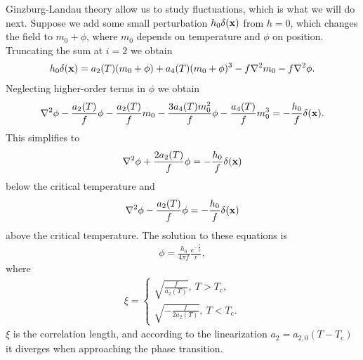 Ginzburg-Landau theory allow us to study fluctuations, which is what we will do next. Suppose we add some small perturbation $h_{0}\delta(\vb{x})$ from $h = 0$, which changes the field to $m_{0} + \phi$, where $m_{0}$ depends on temperature and $\phi$ on position. Truncating the sum at $i = 2$ we obtain
\begin{align*}
	h_{0}\delta(\vb{x}) = a_{2}(T)(m_{0} + \phi) + a_{4}(T)(m_{0} + \phi)^{3} - f\laplacian{m_{0}} - f\laplacian{\phi}.
\end{align*}
Neglecting higher-order terms in $\phi$ we obtain
\begin{align*}
	\laplacian{\phi} - \frac{a_{2}(T)}{f}\phi - \frac{a_{2}(T)}{f}m_{0} - \frac{3a_{4}(T)m_{0}^{2}}{f}\phi - \frac{a_{4}(T)}{f}m_{0}^{3} = -\frac{h_{0}}{f}\delta(\vb{x}).
\end{align*}
This simplifies to
\begin{align*}
	\laplacian{\phi} + \frac{2a_{2}(T)}{f}\phi = -\frac{h_{0}}{f}\delta(\vb{x})
\end{align*}
below the critical temperature and
\begin{align*}
	\laplacian{\phi} - \frac{a_{2}(T)}{f}\phi = -\frac{h_{0}}{f}\delta(\vb{x})
\end{align*}
above the critical temperature. The solution to these equations is
\begin{align*}
	\phi = \frac{h_{0}}{4\pi f}\frac{e^{-\frac{r}{\xi}}}{r},
\end{align*}
where
\begin{align*}
	\xi =
	\begin{cases}
		\sqrt{\frac{f}{a_{2}(T)}},\ T > T_{\text{c}}, \\
		\sqrt{-\frac{f}{2a_{2}(T)}},\ T < T_{\text{c}}.
	\end{cases}
\end{align*}
$\xi$ is the correlation length, and according to the linearization $a_{2} = a_{2, 0}(T - T_{\text{c}})$ it diverges when approaching the phase transition.

